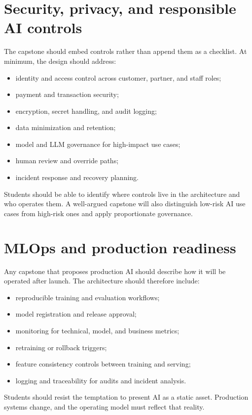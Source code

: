 \section{Security, privacy, and responsible AI controls}
The capstone should embed controls rather than append them as a checklist. At minimum, the design should address:
\begin{itemize}
  \item identity and access control across customer, partner, and staff roles;
  \item payment and transaction security;
  \item encryption, secret handling, and audit logging;
  \item data minimization and retention;
  \item model and LLM governance for high-impact use cases;
  \item human review and override paths;
  \item incident response and recovery planning.
\end{itemize}

Students should be able to identify where controls live in the architecture and who operates them. A well-argued capstone will also distinguish low-risk AI use cases from high-risk ones and apply proportionate governance.

\section{MLOps and production readiness}
Any capstone that proposes production AI should describe how it will be operated after launch. The architecture should therefore include:
\begin{itemize}
  \item reproducible training and evaluation workflows;
  \item model registration and release approval;
  \item monitoring for technical, model, and business metrics;
  \item retraining or rollback triggers;
  \item feature consistency controls between training and serving;
  \item logging and traceability for audits and incident analysis.
\end{itemize}

Students should resist the temptation to present AI as a static asset. Production systems change, and the operating model must reflect that reality.


